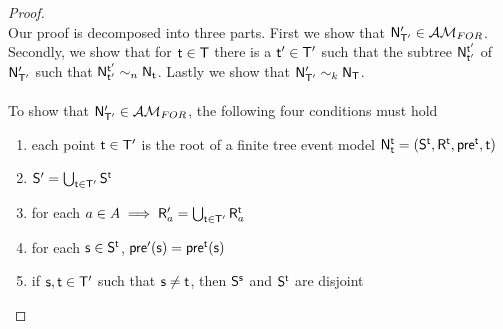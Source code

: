 \begin{proof}
\[\]
Our proof is decomposed into three parts.
First we show that $\evM'_{\evT'} \in \forestClass$.
Secondly, we show that for $\evt \in \evT$ there is a $\evt' \in \evT'$ such that the subtree $\evM^{\evt'}_{\evt'}$ of
$\evM'_{\evT'}$ such that $\evM^{\evt'}_{\evt'} \sim_n \evM_\evt$.
Lastly we show that $\evM'_{\evT'} \sim_k \evM_\evT$.\\
\\
To show that $\evM'_{\evT'} \in \forestClass$, the following four conditions must hold
\begin{enumerate}
	\item each point $\evt \in \evT'$ is the root of a finite tree event model $\evM^\evt_\evt = (\evS^\evt, \evR^\evt, \evpr^\evt, \evt)$ \label{forestConOne}
  \item $\evS' = \bigcup_{\evt \in \evT'} \evS^\evt$ \label{forestConTwo}
  \item for each $a \in A \implies \evR'_a = \bigcup_{\evt \in \evT'} \evR^\evt_a$ \label{forestConFive}
	\item for each $\evs \in \evS^\evt$, $\evpr'(\evs) = \evpr^\evt(\evs)$ \label{forestConThree}
	\item if $\evs, \evt \in \evT'$ such that $\evs \neq \evt$, then $\evS^\evs$ and $\evS^\evt$ are disjoint
	\label{forestConFour}
\end{enumerate}


\end{proof}
